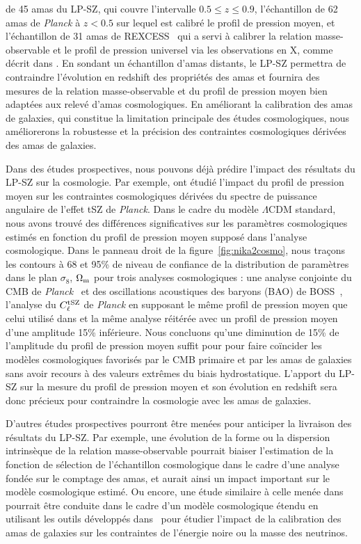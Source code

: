 de 45 amas du LP-SZ, qui couvre l'intervalle $0.5 \le z \le 0.9$,
l'échantillon de 62 amas de \emph{Planck} à $z<0.5$ sur lequel est
calibré le profil de pression moyen, et l'échantillon de 31 amas de
REXCESS~\citep{Pratt2009} qui a servi à calibrer la relation
masse-observable et le profil de pression universel via les
observations en X, comme décrit dans \citet{Arnaud2010}. En sondant un
échantillon d'amas distants,
le LP-SZ permettra de contraindre l'évolution en redshift des
propriétés des amas et fournira des mesures de la relation
masse-observable et du profil de pression moyen bien adaptées aux
relevé d'amas cosmologiques. En améliorant la calibration des amas de
galaxies, qui constitue la limitation principale des études
cosmologiques, nous améliorerons la robustesse et la précision des
contraintes cosmologiques dérivées des amas de galaxies.

Dans des études prospectives, nous pouvons déjà prédire l'impact des
résultats du LP-SZ sur la cosmologie. Par exemple, \citet{Ruppin2019b}
ont étudié l'impact du profil de pression moyen sur les contraintes
cosmologiques dérivées du spectre de puissance angulaire de l'effet
tSZ de \emph{Planck}. Dans le cadre du modèle $\Lambda$CDM standard,
nous avons trouvé des différences significatives sur les paramètres
cosmologiques estimés en fonction du  profil de pression moyen supposé
dans l'analyse cosmologique. Dans le panneau droit de la
figure~\ref{fig:nika2cosmo}, nous traçons les contours à 68 et 95\% de
niveau de confiance de la distribution de paramètres dans le plan
$\sigma_8$, $\Omega_{\rm{m}}$ pour trois analyses cosmologiques :
une analyse conjointe du CMB de
\emph{Planck}~\citep{Planck_2018_cosmo} et des oscillations
acoustiques des baryons (BAO) de BOSS~\citep{Anderson2014}, l'analyse
du $C_\ell^{\rm{tSZ}}$ de \emph{Planck} en supposant le même profil de
pression moyen que celui utilisé dans \citet{Planck2016_ymap} et la
même analyse réitérée avec un profil de pression moyen d'une amplitude
15\% inférieure. Nous concluons qu'une diminution de 15\% de
l'amplitude du profil de pression moyen suffit pour pour faire
coïncider les modèles cosmologiques favorisés par le CMB primaire et
par les amas de galaxies sans avoir recours à des valeurs extrêmes du
biais hydrostatique. L'apport du LP-SZ sur la mesure du profil de
pression moyen et son évolution en redshift sera donc précieux pour
contraindre la cosmologie avec les amas de galaxies. 

D'autres études prospectives pourront être menées pour anticiper la
livraison des résultats du LP-SZ. Par exemple, une évolution de la
forme ou la dispersion intrinsèque de la relation masse-observable
pourrait biaiser l'estimation de la fonction de sélection de
l'échantillon cosmologique dans le cadre d'une analyse fondée
sur le comptage des amas, et aurait ainsi un impact important sur le
modèle cosmologique estimé. Ou encore, une étude similaire à
celle menée dans~\citet{Ruppin2019b} pourrait être conduite dans le
cadre d'un modèle cosmologique étendu en utilisant les outils
développés dans~\citet{Bolliet2018, Bolliet2019} pour étudier l'impact
de la calibration des amas de galaxies sur les contraintes de
l'énergie noire ou la masse des neutrinos.\\

